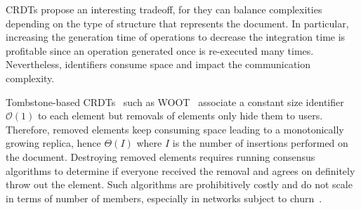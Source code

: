 \noindent CRDTs propose an interesting tradeoff, for they can balance
complexities depending on the type of structure that represents the document.
In particular, increasing the generation time of operations to decrease the
integration time is profitable since an operation generated once is re-executed
many times. Nevertheless, identifiers consume space and impact the communication
complexity.

Tombstone-based CRDTs~\cite{ahmed2011evaluating, conway2014language,
  grishchenko2010deep, oster2006data, roh2011replicated, weiss2007wooki,
  wu2010partial, yu2012stringwise} such as WOOT~\cite{oster2006data} associate a
constant size identifier $\mathcal{O}(1)$ to each element but removals of
elements only hide them to users. Therefore, removed elements keep consuming
space leading to a monotonically growing replica, hence $\Theta(I)$ where $I$ is
the number of insertions performed on the document.  Destroying removed elements
requires running consensus algorithms to determine if everyone received the
removal and agrees on definitely throw out the element. Such algorithms are
prohibitively costly and do not scale in terms of number of members, especially
in networks subject to churn~\cite{mostefaoui2015signature}.

